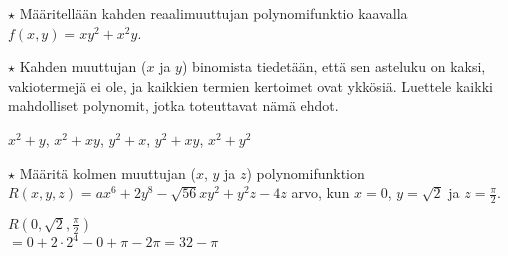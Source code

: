 \begin{tehtavasivu}
\begin{tehtava}
	$\star$ Määritellään kahden reaalimuuttujan polynomifunktio kaavalla $f(x,y)=xy^2+x^2y$.
	\begin{vastaus}
	\end{vastaus}
\end{tehtava}

\begin{tehtava}
	$\star$ Kahden muuttujan ($x$ ja $y$) binomista tiedetään, että sen asteluku on kaksi, vakiotermejä ei ole, ja kaikkien termien kertoimet ovat ykkösiä. Luettele kaikki mahdolliset polynomit, jotka toteuttavat nämä ehdot.
	\begin{vastaus}
		$x^2+y$, $x^2+xy$, $y^2+x$, $y^2+xy$, $x^2+y^2$
	\end{vastaus}
\end{tehtava}


\begin{tehtava}
	$\star$ Määritä kolmen muuttujan ($x$, $y$ ja $z$) polynomifunktion $R(x,y,z)=ax^6+2y^8-\sqrt{56}xy^2+y^2z-4z$
	arvo, kun $x=0$, $y=\sqrt{2}$ ja $z=\frac{\pi}{2}$.
	\begin{vastaus}
	$R(0,\sqrt{2},\frac{\pi}{2})$ \\ $=0+2\cdot2^4-0+\pi-2\pi=32-\pi$
	\end{vastaus}
\end{tehtava}

\end{tehtavasivu}